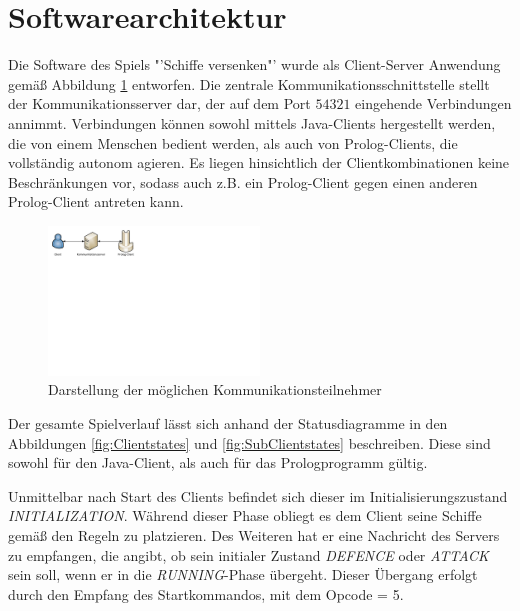 \section{Softwarearchitektur} \label{sec:Softwarearchitektur}

Die Software des Spiels "'Schiffe versenken"' wurde als Client-Server Anwendung gemäß Abbildung \ref{fig:Kommunikationsteilnehmer} entworfen.
Die zentrale Kommunikationsschnittstelle stellt der Kommunikationsserver dar, der auf dem Port $54321$ eingehende Verbindungen annimmt.
Verbindungen können sowohl mittels Java-Clients hergestellt werden, die von einem Menschen bedient werden, als auch von Prolog-Clients, die vollständig autonom agieren.
Es liegen hinsichtlich der Clientkombinationen keine Beschränkungen vor, sodass auch z.B. ein Prolog-Client gegen einen anderen Prolog-Client antreten kann.

\begin{figure}[H]
  \centering
  \includegraphics[trim=0mm 165mm 175mm 0mm,clip,width=0.5\textwidth]{images/Kommunikationsmodell.pdf}
  \caption{Darstellung der möglichen Kommunikationsteilnehmer}
  \label{fig:Kommunikationsteilnehmer}
\end{figure}

Der gesamte Spielverlauf lässt sich anhand der Statusdiagramme in den Abbildungen \ref{fig:Clientstates} und \ref{fig:SubClientstates} beschreiben.
Diese sind sowohl für den Java-Client, als auch für das Prologprogramm gültig.

Unmittelbar nach Start des Clients befindet sich dieser im Initialisierungszustand \emph{INITIALIZATION}.
Während dieser Phase obliegt es dem Client seine Schiffe gemäß den Regeln zu platzieren.
Des Weiteren hat er eine Nachricht des Servers zu empfangen, die angibt, ob sein initialer Zustand \emph{DEFENCE} oder \emph{ATTACK} sein soll, wenn er in die \emph{RUNNING}-Phase übergeht.
Dieser Übergang erfolgt durch den Empfang des Startkommandos, mit dem Opcode = 5.


